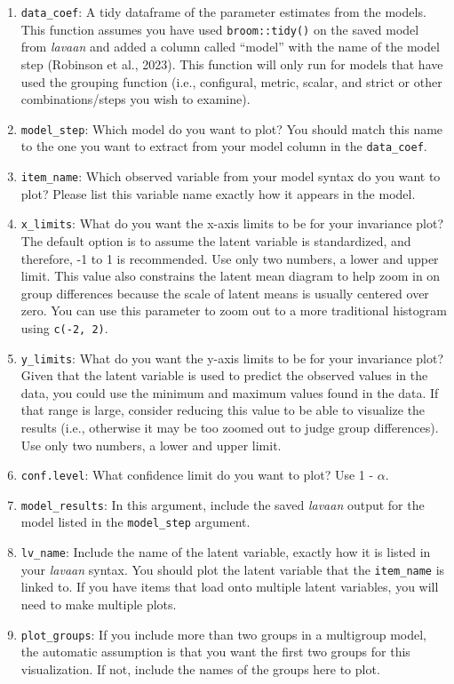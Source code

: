\documentclass[
  man]{apa7}
\providecommand{\tightlist}{%
  \setlength{\itemsep}{0pt}\setlength{\parskip}{0pt}}
\begin{document}
\begin{enumerate}
\def\labelenumi{\arabic{enumi})}
\tightlist
\item
  \texttt{data\_coef}: A tidy dataframe of the parameter estimates from the models. This function assumes you have used \texttt{broom::tidy()} on the saved model from \emph{lavaan} and added a column called ``model'' with the name of the model step (Robinson et al., 2023). This function will only run for models that have used the grouping function (i.e., configural, metric, scalar, and strict or other combinations/steps you wish to examine).
\item
  \texttt{model\_step}: Which model do you want to plot? You should match this name to the one you want to extract from your model column in the \texttt{data\_coef}.
\item
  \texttt{item\_name}: Which observed variable from your model syntax do you want to plot? Please list this variable name exactly how it appears in the model.
\item
  \texttt{x\_limits}: What do you want the x-axis limits to be for your invariance plot? The default option is to assume the latent variable is standardized, and therefore, -1 to 1 is recommended. Use only two numbers, a lower and upper limit. This value also constrains the latent mean diagram to help zoom in on group differences because the scale of latent means is usually centered over zero. You can use this parameter to zoom out to a more traditional histogram using \texttt{c(-2,\ 2)}.
\item
  \texttt{y\_limits}: What do you want the y-axis limits to be for your invariance plot? Given that the latent variable is used to predict the observed values in the data, you could use the minimum and maximum values found in the data. If that range is large, consider reducing this value to be able to visualize the results (i.e., otherwise it may be too zoomed out to judge group differences). Use only two numbers, a lower and upper limit.
\item
  \texttt{conf.level}: What confidence limit do you want to plot? Use 1 - \(\alpha\).
\item
  \texttt{model\_results}: In this argument, include the saved \emph{lavaan} output for the model listed in the \texttt{model\_step} argument.
\item
  \texttt{lv\_name}: Include the name of the latent variable, exactly how it is listed in your \emph{lavaan} syntax. You should plot the latent variable that the \texttt{item\_name} is linked to. If you have items that load onto multiple latent variables, you will need to make multiple plots.
\item
  \texttt{plot\_groups}: If you include more than two groups in a multigroup model, the automatic assumption is that you want the first two groups for this visualization. If not, include the names of the groups here to plot.
\end{enumerate}
\end{document}
